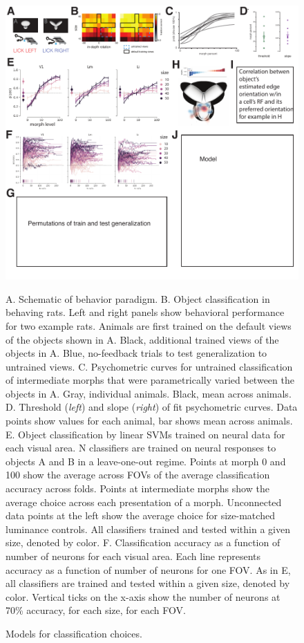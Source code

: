 \documentclass{article}
\begin{document}
\begin{figure}[ht]
  \includegraphics[width=\textwidth]{figures/allstim.pdf}
  \caption{Models for classification choices.}
  \medskip
  \small
  A.  Schematic of behavior paradigm.
  B.  Object classification in behaving rats.  Left and right panels show behavioral performance for two example rats.  Animals are first trained on the default views of the objects shown in A.  Black, additional trained views of the objects in A.  Blue, no-feedback trials to test generalization to untrained views. 
  C.  Psychometric curves for untrained classification of intermediate morphs that were parametrically varied between the objects in A. Gray, individual animals. Black, mean across animals. 
  D.  Threshold (\textit{left}) and slope (\textit{right}) of fit psychometric curves. Data points show values for each animal, bar shows mean across animals. 
  E.  Object classification by linear SVMs trained on neural data for each visual area.  N classifiers are trained on neural responses to objects A and B in a leave-one-out regime. Points at morph 0 and 100 show the average across FOVs of the average classification accuracy across folds. Points at intermediate morphs show the average choice across each presentation of a morph. Unconnected data points at the left show the average choice for size-matched luminance controls.  All classifiers trained and tested within a given size, denoted by color.  
  F.  Classification accuracy as a function of number of neurons for each visual area. Each line represents accuracy as a function of number of neurons for one FOV. As in E, all classifiers are trained and tested within a given size, denoted by color.  Vertical ticks on the x-axis show the number of neurons at 70\% accuracy, for each size, for each FOV.

\end{figure}
\end{document}
